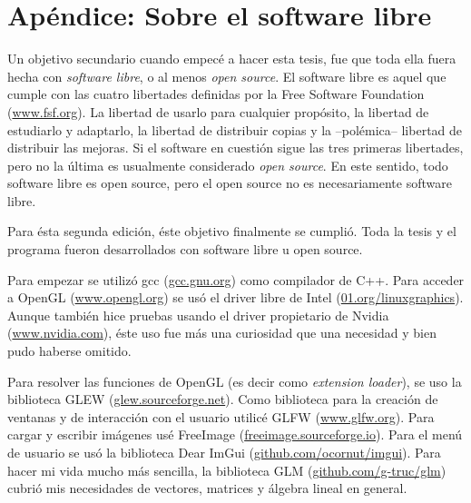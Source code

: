 \chapter*{Apéndice: Sobre el software libre}
\label{sec:apendice}

Un objetivo secundario cuando empecé a hacer esta tesis, fue que toda ella fuera hecha con \emph{software libre}, o al menos \emph{open source}.
El software libre es aquel que cumple con las cuatro libertades definidas por la Free Software Foundation (\href{https://www.fsf.org}{www.fsf.org}).
La libertad de usarlo para cualquier propósito, la libertad de estudiarlo y adaptarlo, la libertad de distribuir copias y la --polémica-- libertad de distribuir las mejoras.
Si el software en cuestión sigue las tres primeras libertades, pero no la última es usualmente considerado \emph{open source}.
En este sentido, todo software libre es open source, pero el open source no es necesariamente software  libre.

Para ésta segunda edición, éste objetivo finalmente se cumplió. Toda la tesis y el programa fueron desarrollados con software libre u open source.

Para empezar se utilizó gcc (\href{http://gcc.gnu.org/}{gcc.gnu.org}) como compilador de C++.
Para acceder a OpenGL (\href{https://www.opengl.org/}{www.opengl.org}) se usó el driver libre de Intel (\href{https://01.org/linuxgraphics}{01.org/linuxgraphics}).
Aunque también hice pruebas usando el driver propietario de Nvidia (\href{https://www.nvidia.com}{www.nvidia.com}), éste uso fue más una curiosidad que una necesidad y bien pudo haberse omitido.

Para resolver las funciones de OpenGL (es decir como \emph{\textenglish{extension loader}}), se uso la biblioteca GLEW (\href{http://glew.sourceforge.net/}{glew.sourceforge.net}).
Como biblioteca para la creación de ventanas y de interacción con el usuario utilicé GLFW (\href{https://www.glfw.org/}{www.glfw.org}).
Para cargar y escribir imágenes usé FreeImage (\href{https://freeimage.sourceforge.io/}{freeimage.sourceforge.io}).
Para el menú de usuario se usó la biblioteca Dear ImGui (\href{https://github.com/ocornut/imgui}{github.com/ocornut/imgui}).
Para hacer mi vida mucho más sencilla, la biblioteca GLM (\href{https://github.com/g-truc/glm}{github.com/g-truc/glm}) cubrió mis necesidades de vectores, matrices y álgebra lineal en general.

